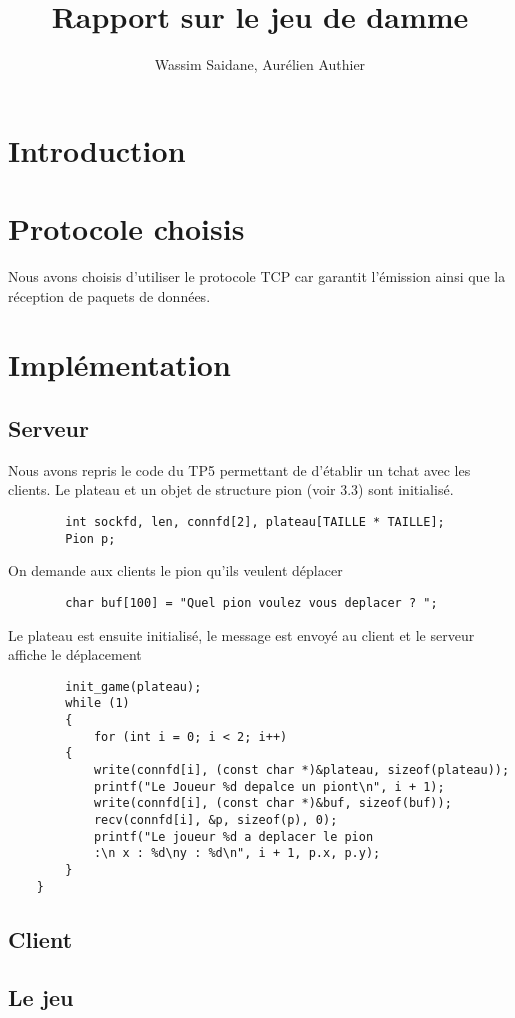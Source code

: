 \documentclass{article}
\title{Rapport sur le jeu de damme}
\author{Wassim Saidane, Aurélien Authier}
\date{}
\begin{document}
    \lstset{language=C}
    \maketitle
    \tableofcontents
    \newpage
    \section{Introduction}

    \section{Protocole choisis}
        Nous avons choisis d'utiliser le protocole TCP car garantit l’émission ainsi que la réception de paquets de données.
    \section{Implémentation}
    \subsection{Serveur}
    Nous avons repris le code du TP5 permettant de d'établir un tchat avec les clients.
    Le plateau et un objet de structure pion (voir 3.3) sont initialisé.
    \begin{lstlisting}
        int sockfd, len, connfd[2], plateau[TAILLE * TAILLE];
        Pion p;
    \end{lstlisting}
    On demande aux clients le pion qu'ils veulent déplacer 
    \begin{lstlisting}
        char buf[100] = "Quel pion voulez vous deplacer ? ";
    \end{lstlisting}
    Le plateau est ensuite initialisé, le message est envoyé au client et le serveur affiche le déplacement
    \begin{lstlisting}
        init_game(plateau);
        while (1)
        {
            for (int i = 0; i < 2; i++)
        {
            write(connfd[i], (const char *)&plateau, sizeof(plateau));
            printf("Le Joueur %d depalce un piont\n", i + 1);
            write(connfd[i], (const char *)&buf, sizeof(buf));
            recv(connfd[i], &p, sizeof(p), 0);
            printf("Le joueur %d a deplacer le pion 
            :\n x : %d\ny : %d\n", i + 1, p.x, p.y);
        }
    }
    \end{lstlisting}

    
    \subsection{Client}
    
    \subsection{Le jeu}
\end{document}
